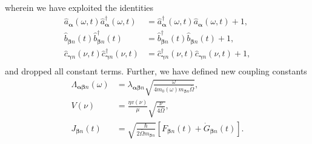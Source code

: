 \documentclass{article}
\begin{document}
wherein we have exploited the identities
\begin{equation}
\begin{split}
\hat{a}_{\bm{\alpha}}(\omega,t)\hat{a}_{\bm{\alpha}}^\dagger(\omega,t) &= \hat{a}_{\bm{\alpha}}^\dagger(\omega,t)\hat{a}_{\bm{\alpha}}(\omega,t) + 1,\\
\hat{b}_{\bm{\beta}n}(t)\hat{b}_{\bm{\beta}n}^\dagger(t) &= \hat{b}_{\bm{\beta}n}^\dagger(t)\hat{b}_{\bm{\beta}n}(t) + 1,\\
\hat{c}_{\bm{\gamma}n}(\nu,t)\hat{c}_{\bm{\gamma}n}^\dagger(\nu,t) &= \hat{c}_{\bm{\gamma}n}^\dagger(\nu,t)\hat{c}_{\bm{\gamma}n}(\nu,t) + 1,\\
\end{split}
\end{equation}
and dropped all constant terms. Further, we have defined new coupling constants
\begin{equation}
\begin{split}
\Lambda_{\bm{\alpha}\bm{\beta}n}(\omega) &= \lambda_{\bm{\alpha}\bm{\beta}n}\sqrt{\frac{\omega}{4m_0(\omega)m_{\bm{\beta}n}\bar{\Omega}}},\\
V(\nu) &= \frac{\eta v(\nu)}{\mu}\sqrt{\frac{\nu}{4\bar{\Omega}}},\\
J_{\bm{\beta}n}(t) &= \sqrt{\frac{\hbar}{2\bar{\Omega}m_{\bm{\beta}n}}}\left[F_{\bm{\beta}n}(t) + \dot{G}_{\bm{\beta}n}(t)\right].
\end{split}
\end{equation}

\end{document}
